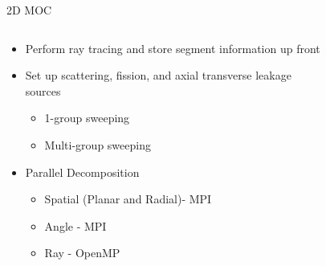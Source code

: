 \begin{frame}[t]{2D MOC}
  
  \begin{columns}
    \begin{column}{0.55\textwidth}
      \begin{itemize}
        \item Perform ray tracing and store segment information up front
        \item Set up scattering, fission, and axial transverse leakage sources
        \begin{itemize}
          \item 1-group sweeping
          \item Multi-group sweeping
        \end{itemize}
        \item Parallel Decomposition
        \begin{itemize}
          \item Spatial (Planar and Radial)- MPI
          \item Angle - MPI
          \item Ray - OpenMP
        \end{itemize}
      \end{itemize}
    \end{column}
    \begin{column}{0.45\textwidth}
      \begin{figure}[h]
        \centering
        \resizebox{!}{0.7\textheight}{}
      \end{figure}
    \end{column}
  \end{columns}

\end{frame}